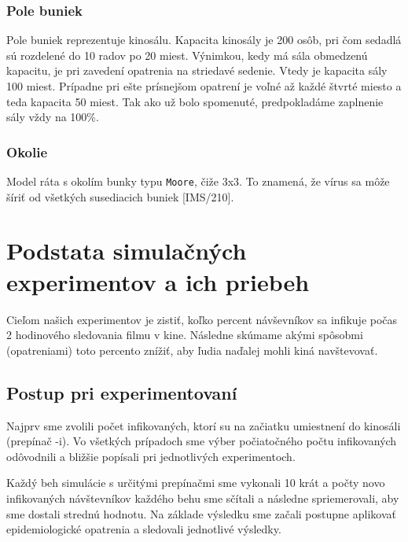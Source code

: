 \documentclass[a4paper, 11pt]{article}
\begin{document}
        \subsubsection{Pole buniek}
        Pole buniek reprezentuje kinosálu. Kapacita kinosály je 200 osôb, pri čom sedadlá sú rozdelené do 10 radov po 20 miest. Výnimkou, kedy má sála obmedzenú kapacitu, je pri zavedení opatrenia na striedavé sedenie. Vtedy je kapacita sály 100 miest. Prípadne pri ešte prísnejšom opatrení je voľné až každé štvrté miesto a teda kapacita 50 miest. Tak ako už bolo spomenuté, predpokladáme zaplnenie sály vždy na 100\%.
        
        \subsubsection{Okolie}
        Model ráta s okolím bunky typu \texttt{Moore}, čiže 3x3. To znamená, že vírus sa môže šíriť od všetkých susediacich buniek [IMS/210].
    
        
    \section{Podstata simulačných experimentov a ich priebeh}
        \par Cieľom našich experimentov je zistiť, koľko percent návševníkov sa infikuje počas 2 hodinového sledovania filmu v kine. Následne skúmame akými spôsobmi (opatreniami) toto percento znížiť, aby ľudia naďalej mohli kiná navštevovať.
        
        \subsection{Postup pri experimentovaní}
        Najprv sme zvolili počet infikovaných, ktorí su na začiatku umiestnení do kinosáli (prepínač -i). Vo všetkých prípadoch sme výber počiatočného počtu infikovaných odôvodnili a bližšie popísali pri jednotlivých experimentoch.
        \par Každý beh simulácie s určitými prepínačmi sme vykonali 10 krát a počty novo infikovaných návštevníkov každého behu sme sčítali a následne spriemerovali, aby sme dostali strednú hodnotu. Na základe výsledku sme začali postupne aplikovať epidemiologické opatrenia a sledovali jednotlivé výsledky.
        
\end{document}
